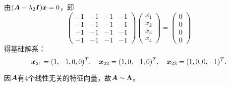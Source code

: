 \begin{frame}
\begin{jie}
  由$(\boldsymbol{A}-\lambda_2\boldsymbol{I}){\boldsymbol{x}}=0$，即
  $$
  \left(
    \begin{array}{rrrr}
      -1&-1&-1&-1\\
      -1&-1&-1&-1\\
      -1&-1&-1&-1\\
      -1&-1&-1&-1
    \end{array}
  \right)
  \left(
    \begin{array}{c}
      x_1\\x_2\\x_3\\x_4
    \end{array}
  \right)=
  \left(
    \begin{array}{c}
      0\\0\\0\\0
    \end{array}
  \right)
  $$
  得基础解系：
  $$
  {\boldsymbol{x}}_{21}=(1,-1,0,0)^T, \quad
  {\boldsymbol{x}}_{22}=(1,0,-1,0)^T, \quad
  {\boldsymbol{x}}_{23}=(1,0,0,-1)^T.
  $$

  因$\boldsymbol{A}$有$4$个线性无关的特征向量，故$\boldsymbol{A}\sim \boldsymbol{\Lambda}$。


\end{jie}
\end{frame}
